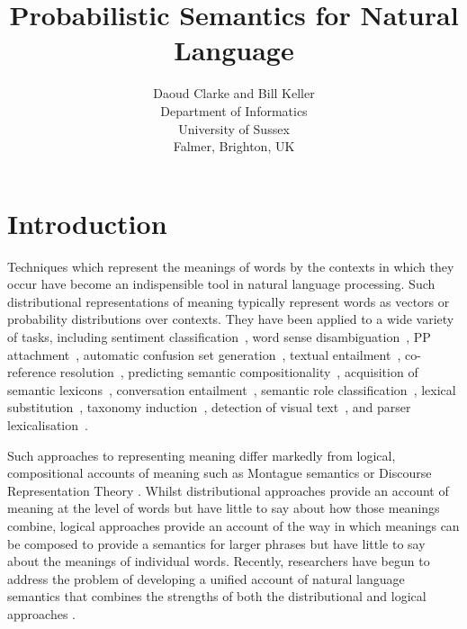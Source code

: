 \documentclass[letterpaper]{article}
\begin{document}
%
\title{Probabilistic Semantics for Natural Language}
\author{Daoud Clarke and Bill Keller\\
Department of Informatics\\
University of Sussex\\
Falmer, Brighton, UK\\
}
\maketitle



\section{Introduction}

Techniques which represent the meanings of words by the contexts in
which they occur have become an indispensible tool in natural language
processing. Such distributional representations of meaning typically
represent words as vectors or probability distributions over
contexts. They have been applied to a wide variety of tasks,
including sentiment classification~\cite{Bollegala2011}, word sense
disambiguation~\cite{miller-EtAl:2012:PAPERS,khapra-EtAl:2010:ACL}, PP
attachment~\cite{Calvo05distributionalthesaurus}, automatic confusion
set generation~\cite{xue-hwa:2012:PAPERS}, textual
entailment~\cite{berant-dagan-goldberger:2010:ACL}, co-reference
resolution~\cite{lee-EtAl:2012:EMNLP-CoNLL}, predicting semantic
compositionality~\cite{bergsma-EtAl:2010:EMNLP}, acquisition of
semantic lexicons~\cite{mcintosh:2010:EMNLP}, conversation
entailment~\cite{zhang-chai:2010:EMNLP}, semantic role
classification~\cite{zapirain-EtAl:2010:NAACLHLT}, lexical
substitution~\cite{szarvas-biemann-gurevych:2013:NAACL-HLT}, taxonomy
induction~\cite{fountain-lapata:2012:NAACL-HLT}, detection of visual
text~\cite{dodge-EtAl:2012:NAACL-HLT}, and parser
lexicalisation~\cite{rei-briscoe:2013:NAACL-HLT}.

Such approaches to representing meaning differ markedly from logical, compositional accounts of meaning
such as Montague semantics or
Discourse Representation Theory \cite{Blackburn:05}. Whilst distributional approaches provide an account of meaning at the level of words but have little to say about how those meanings combine, logical approaches provide an account of the way in which meanings can be composed to provide a semantics for larger phrases but have little to say about the meanings of individual words. 
Recently, researchers have begun to address the problem of  developing a unified account of natural language semantics that combines the strengths of both the distributional and logical approaches
\cite{Clarke:07,Coecke:10,Garrette:11,Lewis:13}. 
\end{document}
